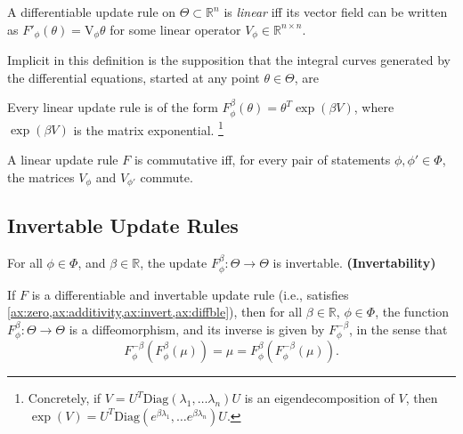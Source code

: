 \documentclass{article}
\begin{document}
\begin{defn}
    A differentiable update rule on $\Theta \subset \mathbb R^n$ is \emph{linear} iff its vector field can be written as
    $F'_\phi(\theta) = \mathrm{V}_\phi \theta$ for some linear operator $V_\phi \in \mathbb R^{n \times n}$.
\end{defn}

Implicit in this definition is the supposition that the integral curves generated by the differential equations, started at any point $\theta \in \Theta$, are 


\begin{prop}
    Every linear update rule is of the form
    $
        F^{\beta}_\phi(\theta) =  \theta^{T} \exp(\beta V)
    $,
    where $\exp(\beta V)$ is the matrix exponential.%
        \footnote{Concretely, if $V = U^T \mathrm{Diag}(\lambda_1, \ldots \lambda_n) U$ is an eigendecomposition of $V$, then $\exp(V) = U^T \mathrm{Diag}(e^{\beta\lambda_1}, \ldots e^{\beta\lambda_n}) U$.}
\end{prop}

\begin{prop}
    A linear update rule $F$ is commutative iff, for every pair of statements  $\phi, \phi' \in \Phi$, the
    matrices $V_\phi$ and $V_{\phi'}$ commute.
\end{prop}



\subsection{Invertable Update Rules}
\begin{URaxioms}
    \item For all $\phi\in\Phi$, and $\beta \in \mathbb R$, the update
    $F^{\beta}_{\phi}: \Theta \to \Theta$ is invertable.
    \hfill\textbf{(Invertability)} \label{ax:invert}
\end{URaxioms}


\begin{prop}
    If $F$ is a differentiable and invertable update rule (i.e., satisfies \cref{ax:zero,ax:additivity,ax:invert,ax:diffble}), then for all $\beta \in \mathbb R$, $\phi \in \Phi$, the function
    $F^\beta_\phi : \Theta \to \Theta$
    is a diffeomorphism, and its inverse is given by $F^{-\beta}_\phi$, in the sense that
    \[
        F^{-\beta}_\phi( F^{\beta}_\phi (\mu) ) = \mu = F^{\beta}_\phi( F^{-\beta}_\phi (\mu) ).
     \]
\end{prop}
\end{document}
